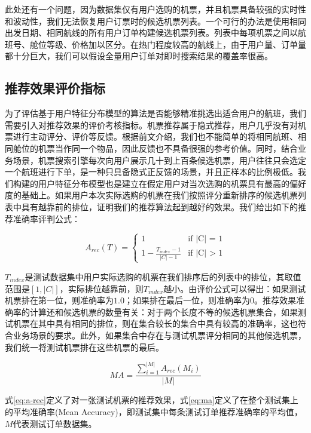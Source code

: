 此处还有一个问题，因为数据集仅有用户选购的机票，并且机票具备较强的实时性和波动性，我们无法恢复用户订票时的候选机票列表。一个可行的办法是使用相同出发日期、相同航线的所有用户订单构建候选机票列表。列表中每项机票之间以航班号、舱位等级、价格加以区分。在热门程度较高的航线上，由于用户量、订单量都十分巨大，我们可以假设全量用户订单对即时搜索结果的覆盖率很高。


\subsection{推荐效果评价指标}
为了评估基于用户特征分布模型的算法是否能够精准挑选出适合用户的航班，我们需要引入对推荐效果的评价考核指标。机票推荐属于隐式推荐，用户几乎没有对机票进行主动评分、评价等反馈。根据前文介绍，我们也不能简单的将相同航班、相同舱位的机票当作同一个物品，因此反馈也不具备很强的参考价值。同时，结合业务场景，机票搜索引擎每次向用户展示几十到上百条候选机票，用户往往只会选定一个航班进行下单，是一种只具备隐式正反馈的场景，并且正样本的比例极低。我们构建的用户特征分布模型也是建立在假定用户对当次选购的机票具有最高的偏好度的基础上。如果用户本次实际选购的机票在我们按照评分重新排序的候选机票列表中具有越靠前的排位，证明我们的推荐算法起到越好的效果。我们给出如下的推荐准确率评判公式：

\begin{equation}
\label{eq:a-rec}
A_{rec}(T) =
\begin{cases}
1 & \mbox{if |C| = 1}\\
1 - \frac{T_{index}-1}{|C|-1} & \mbox{if |C| > 1}
\end{cases}
\end{equation}

$T_{index}$是测试数据集中用户实际选购的机票在我们排序后的列表中的排位，其取值范围是$[1,|C|]$，实际排位越靠前，则$T_{index}$越小。由评价公式可以得出：如果测试机票排在第一位，则准确率为$1.0$；如果排在最后一位，则准确率为$0$。推荐效果准确率的计算还和候选机票的数量有关：对于两个长度不等的候选机票集合，如果测试机票在其中具有相同的排位，则在集合较长的集合中具有较高的准确率，这也符合业务场景的要求。此外，如果集合中存在与测试机票评分相同的其他候选机票，我们统一将测试机票排在这些机票的最后。

\begin{equation}
\label{eq:ma}
MA = \frac{\sum_{i=1}^{|M|}A_{rec}(M_i)}{|M|}
\end{equation}

式\ref{eq:a-rec}定义了对一张测试机票的推荐效果，式\ref{eq:ma}定义了在整个测试集上的平均准确率(Mean Accuracy)，即测试集中每条测试订单推荐准确率的平均值，$M$代表测试订单数据集。

